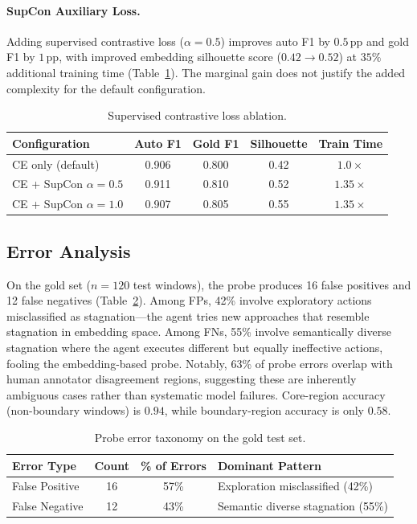 \documentclass[11pt]{article}
\begin{document}
\paragraph{SupCon Auxiliary Loss.}
Adding supervised contrastive loss ($\alpha = 0.5$) improves auto F1 by $0.5$\,pp and gold F1 by $1$\,pp, with improved embedding silhouette score ($0.42 \rightarrow 0.52$) at $35\%$ additional training time (Table~\ref{tab:supcon}).
The marginal gain does not justify the added complexity for the default configuration.

\begin{table}[t]
\centering
\caption{Supervised contrastive loss ablation.}
\label{tab:supcon}
\small
\begin{tabular}{lcccc}
\toprule
Configuration & Auto F1 & Gold F1 & Silhouette & Train Time \\
\midrule
CE only (default) & 0.906 & 0.800 & 0.42 & $1.0\times$ \\
CE + SupCon $\alpha{=}0.5$ & 0.911 & 0.810 & 0.52 & $1.35\times$ \\
CE + SupCon $\alpha{=}1.0$ & 0.907 & 0.805 & 0.55 & $1.35\times$ \\
\bottomrule
\end{tabular}
\end{table}

\subsection{Error Analysis}
\label{sec:error_analysis}

On the gold set ($n = 120$ test windows), the probe produces 16 false positives and 12 false negatives (Table~\ref{tab:errors}).
Among FPs, 42\% involve exploratory actions misclassified as stagnation---the agent tries new approaches that resemble stagnation in embedding space.
Among FNs, 55\% involve semantically diverse stagnation where the agent executes different but equally ineffective actions, fooling the embedding-based probe.
Notably, 63\% of probe errors overlap with human annotator disagreement regions, suggesting these are inherently ambiguous cases rather than systematic model failures.
Core-region accuracy (non-boundary windows) is $0.94$, while boundary-region accuracy is only $0.58$.

\begin{table}[t]
\centering
\caption{Probe error taxonomy on the gold test set.}
\label{tab:errors}
\small
\begin{tabular}{lccl}
\toprule
Error Type & Count & \% of Errors & Dominant Pattern \\
\midrule
False Positive & 16 & 57\% & Exploration misclassified (42\%) \\
False Negative & 12 & 43\% & Semantic diverse stagnation (55\%) \\
\bottomrule
\end{tabular}
\end{table}
\end{document}
